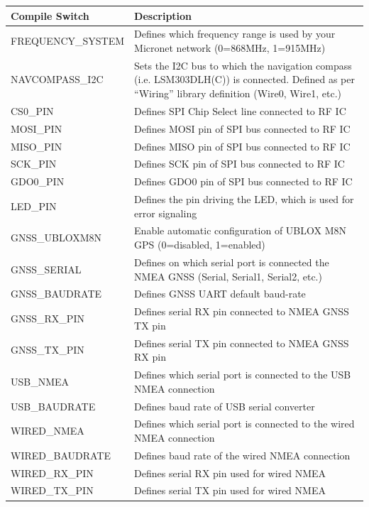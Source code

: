 \documentclass{report}
\begin{document}
	\begin{tabularx}{\linewidth}{@{}lX@{}}
		\hline
		\textbf{Compile Switch} & \textbf{Description}\\
		\hline
		FREQUENCY\_SYSTEM & Defines which frequency range is used by your Micronet network (0=868MHz, 1=915MHz)\\
		\hline
		NAVCOMPASS\_I2C & Sets the I2C bus to which the navigation compass (i.e. LSM303DLH(C)) is connected. Defined as per “Wiring” library definition (Wire0, Wire1, etc.)\\
		\hline
		CS0\_PIN & Defines SPI Chip Select line connected to RF IC\\
		\hline
		MOSI\_PIN & Defines MOSI pin of SPI bus connected to RF IC\\
		\hline
		MISO\_PIN & Defines MISO pin of SPI bus connected to RF IC\\
		\hline
		SCK\_PIN & Defines SCK pin of SPI bus connected to RF IC\\
		\hline
		GDO0\_PIN & Defines GDO0 pin of SPI bus connected to RF IC\\
		\hline
		LED\_PIN & Defines the pin driving the LED, which is used for error signaling\\
		\hline
		GNSS\_UBLOXM8N & Enable automatic configuration of UBLOX M8N GPS (0=disabled, 1=enabled)\\
		\hline
		GNSS\_SERIAL & Defines on which serial port is connected the NMEA GNSS (Serial, Serial1, Serial2, etc.)\\
		\hline
		GNSS\_BAUDRATE & Defines GNSS UART default baud-rate\\
		\hline
		GNSS\_RX\_PIN & Defines serial RX pin connected to NMEA GNSS TX pin\\
		\hline
		GNSS\_TX\_PIN & Defines serial TX pin connected to NMEA GNSS RX pin\\
		\hline
		USB\_NMEA & Defines which serial port is connected to the USB NMEA connection\\
		\hline
		USB\_BAUDRATE & Defines baud rate of USB serial converter\\
		\hline
		WIRED\_NMEA & Defines which serial port is connected to the wired NMEA connection\\
		\hline
		WIRED\_BAUDRATE & Defines baud rate of the wired NMEA connection\\
		\hline
		WIRED\_RX\_PIN & Defines serial RX pin used for wired NMEA\\
		\hline
		WIRED\_TX\_PIN & Defines serial TX pin used for wired NMEA\\

\end{tabularx}
\end{document}
